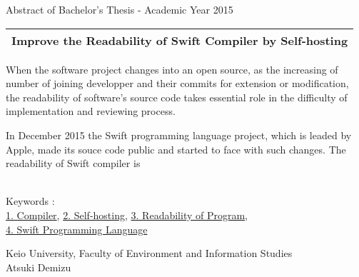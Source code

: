 Abstract of Bachelor's Thesis - Academic Year 2015
\begin{center}
\begin{Large}
\begin{tabular}{|c|} \hline
Improve the Readability of Swift Compiler by Self-hosting
\\
\hline
\end{tabular}
\end{Large}
\end{center}

When the software project changes into an open source, as the increasing of number of joining developper and their commits for extension or modification, the readability of software's source code takes essential role in the difficulty of implementation and reviewing process.

In December 2015 the Swift programming language project, which is leaded by Apple, made its souce code public and started to face with such changes.
The readability of Swift compiler is

~ \\
Keywords : \\
\underline{1. Compiler},
\underline{2. Self-hosting},
\underline{3. Readability of Program},\\
\underline{4. Swift Programming Language}
\begin{flushright}
Keio University, Faculty of Environment and Information Studies\\
Atsuki Demizu
\end{flushright}
